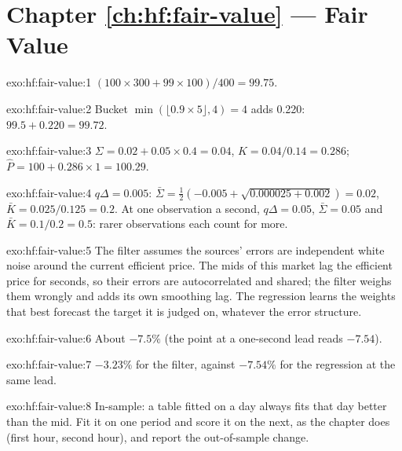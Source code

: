 \section*{Chapter \ref{ch:hf:fair-value} --- Fair Value}

\begin{solution}{exo:hf:fair-value:1}
$(100\times300+99\times100)/400=99.75$.
\end{solution}

\begin{solution}{exo:hf:fair-value:2}
Bucket $\min(\lfloor0.9\times5\rfloor,4)=4$ adds 0.220: $99.5+0.220=99.72$.
\end{solution}

\begin{solution}{exo:hf:fair-value:3}
$\Sigma=0.02+0.05\times0.4=0.04$, $K=0.04/0.14=0.286$; $\hat P=100+0.286\times1=100.29$.
\end{solution}

\begin{solution}{exo:hf:fair-value:4}
$q\Delta=0.005$: $\bar\Sigma=\tfrac12(-0.005+\sqrt{0.000025+0.002})=0.02$, $\bar K=0.025/0.125=0.2$. At one observation a second,
$q\Delta=0.05$, $\bar\Sigma=0.05$ and $\bar K=0.1/0.2=0.5$: rarer observations each count for more.
\end{solution}

\begin{solution}{exo:hf:fair-value:5}
The filter assumes the sources' errors are independent white noise around the current efficient price. The mids of this market lag the efficient
price for seconds, so their errors are autocorrelated and shared; the filter weighs them wrongly and adds its own smoothing lag. The regression
learns the weights that best forecast the target it is judged on, whatever the error structure.
\end{solution}

\begin{solution}{exo:hf:fair-value:6}
About $-7.5\%$ (the point at a one-second lead reads $-7.54$).
\end{solution}

\begin{solution}{exo:hf:fair-value:7}
$-3.23\%$ for the filter, against $-7.54\%$ for the regression at the same lead.
\end{solution}

\begin{solution}{exo:hf:fair-value:8}
In-sample: a table fitted on a day always fits that day better than the mid. Fit it on one period and score it on the next, as the chapter does
(first hour, second hour), and report the out-of-sample change.
\end{solution}

